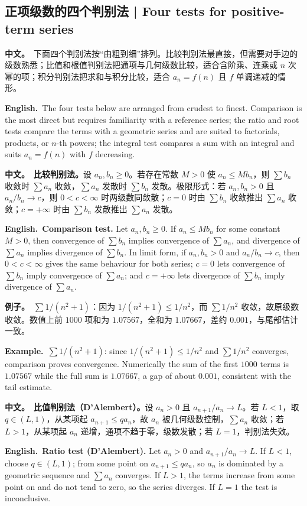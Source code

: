 \documentclass[UTF8,11pt,a4paper]{ctexart}
\newcommand{\BOTH}[2]{\par\noindent\textbf{中文。}\ #1\par\noindent\textbf{English.}\ #2\par}
\newcommand{\EX}[2]{\par\noindent\textbf{例子。}\ #1\par\noindent\textbf{Example.}\ #2\par}
\begin{document}
\subsection{正项级数的四个判别法 | Four tests for positive-term series}
\BOTH{下面四个判别法按“由粗到细”排列。比较判别法最直接，但需要对手边的级数熟悉；比值和根值判别法把通项与几何级数比较，适合含阶乘、连乘或 $n$ 次幂的项；积分判别法把求和与积分比较，适合 $a_n=f(n)$ 且 $f$ 单调递减的情形。}{The four tests below are arranged from crudest to finest. Comparison is the most direct but requires familiarity with a reference series; the ratio and root tests compare the terms with a geometric series and are suited to factorials, products, or $n$-th powers; the integral test compares a sum with an integral and suits $a_n=f(n)$ with $f$ decreasing.}
\BOTH{\textbf{比较判别法。}设 $a_n,b_n\ge0$。若存在常数 $M>0$ 使 $a_n\le Mb_n$，则 $\sum b_n$ 收敛时 $\sum a_n$ 收敛，$\sum a_n$ 发散时 $\sum b_n$ 发散。极限形式：若 $a_n,b_n>0$ 且 $a_n/b_n\to c$，则 $0<c<\infty$ 时两级数同敛散；$c=0$ 时由 $\sum b_n$ 收敛推出 $\sum a_n$ 收敛；$c=+\infty$ 时由 $\sum b_n$ 发散推出 $\sum a_n$ 发散。}{\textbf{Comparison test.} Let $a_n,b_n\ge0$. If $a_n\le Mb_n$ for some constant $M>0$, then convergence of $\sum b_n$ implies convergence of $\sum a_n$, and divergence of $\sum a_n$ implies divergence of $\sum b_n$. In limit form, if $a_n,b_n>0$ and $a_n/b_n\to c$, then $0<c<\infty$ gives the same behaviour for both series; $c=0$ lets convergence of $\sum b_n$ imply convergence of $\sum a_n$; and $c=+\infty$ lets divergence of $\sum b_n$ imply divergence of $\sum a_n$.}
\EX{$\sum1/(n^2+1)$：因为 $1/(n^2+1)\le1/n^2$，而 $\sum1/n^2$ 收敛，故原级数收敛。数值上前 $1000$ 项和为 $1.07567$，全和为 $1.07667$，差约 $0.001$，与尾部估计一致。}{$\sum1/(n^2+1)$: since $1/(n^2+1)\le1/n^2$ and $\sum1/n^2$ converges, comparison proves convergence. Numerically the sum of the first $1000$ terms is $1.07567$ while the full sum is $1.07667$, a gap of about $0.001$, consistent with the tail estimate.}
\BOTH{\textbf{比值判别法（D'Alembert）。}设 $a_n>0$ 且 $a_{n+1}/a_n\to L$。若 $L<1$，取 $q\in(L,1)$，从某项起 $a_{n+1}\le qa_n$，故 $a_n$ 被几何级数控制，$\sum a_n$ 收敛；若 $L>1$，从某项起 $a_n$ 递增，通项不趋于零，级数发散；若 $L=1$，判别法失效。}{\textbf{Ratio test (D'Alembert).} Let $a_n>0$ and $a_{n+1}/a_n\to L$. If $L<1$, choose $q\in(L,1)$; from some point on $a_{n+1}\le qa_n$, so $a_n$ is dominated by a geometric sequence and $\sum a_n$ converges. If $L>1$, the terms increase from some point on and do not tend to zero, so the series diverges. If $L=1$ the test is inconclusive.}
\end{document}
